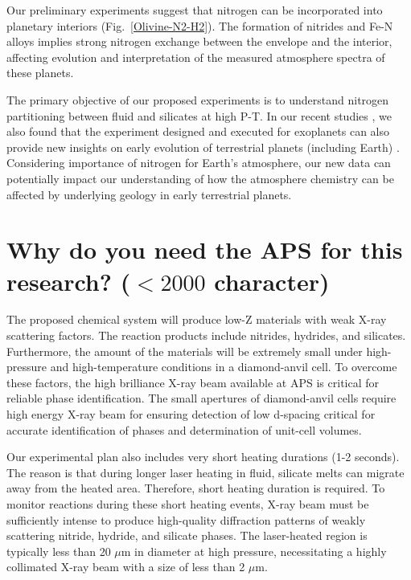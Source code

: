 Our preliminary experiments suggest that nitrogen can be incorporated into planetary interiors (Fig.~\ref{Olivine-N2-H2}). 
The formation of nitrides and Fe-N alloys implies strong nitrogen exchange between the envelope and the interior, affecting evolution and interpretation of the measured atmosphere spectra of these planets.

The primary objective of our proposed experiments is to understand nitrogen partitioning between fluid and silicates at high P-T.
In our recent studies \cite{horn_Building_2025}, we also found that the experiment designed and executed for exoplanets can also provide new insights on early evolution of terrestrial planets (including Earth) \cite{young_Earth_2023}. %
Considering importance of nitrogen for Earth's atmosphere, our new data can potentially impact our understanding of how the atmosphere chemistry can be affected by underlying geology in early terrestrial planets.


\section{Why do you need the APS for this research?  ($<2000$ character)}

The proposed chemical system will produce low-Z materials with weak X-ray scattering factors. 
The reaction products include nitrides, hydrides, and silicates.
Furthermore, the amount of the materials will be extremely small under high-pressure and high-temperature conditions in a diamond-anvil cell. 
To overcome these factors, the high brilliance X-ray beam available at APS is critical for reliable phase identification.
The small apertures of diamond-anvil cells require high energy X-ray beam for ensuring detection of low d-spacing critical for accurate identification of phases and determination of unit-cell volumes. 


Our experimental plan also includes very short heating durations (1-2 seconds). 
The reason is that during longer laser heating in fluid, silicate melts can migrate away from the heated area.
Therefore, short heating duration is required.
To monitor reactions during these short heating events, X-ray beam must be sufficiently intense to produce high-quality diffraction patterns of weakly scattering nitride, hydride, and silicate phases. 
The laser-heated region is typically less than 20 $\mu$m in diameter at high pressure, necessitating a highly collimated X-ray beam with a size of less than 2 $\mu$m.

